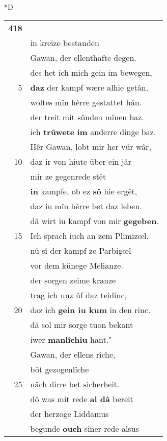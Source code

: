\documentclass[8pt,a4paper,notitlepage]{article}
\begin{document}
\begin{table}[ht]
\begin{minipage}[t]{0.5\linewidth}
\small
\begin{center}*D
\end{center}
\begin{tabular}{rl}
\textbf{418} & \textbf{\begin{large}D\end{large}â} wære von mînen handen\\ 
 & in kreize bestanden\\ 
 & Gawan, der ellenthafte degen.\\ 
 & des het ich mich gein im bewegen,\\ 
5 & \textbf{daz} der kampf wære alhie getân,\\ 
 & woltes mîn hêrre gestattet hân.\\ 
 & der treit mit sünden mînen haz.\\ 
 & ich \textbf{trûwete} \textbf{im} anderre dinge baz.\\ 
 & Hêr Gawan, lobt mir her vür wâr,\\ 
10 & daz ir von hiute über ein jâr\\ 
 & mir ze gegenrede stêt\\ 
 & \textbf{in} kampfe, ob ez \textbf{sô} hie ergêt,\\ 
 & daz iu mîn hêrre læt daz leben.\\ 
 & dâ wirt iu kampf von mir \textbf{gegeben}.\\ 
15 & Ich sprach iuch an zem Plimizœl.\\ 
 & nû sî der kampf ze Parbigœl\\ 
 & vor dem künege Melianze.\\ 
 & der sorgen zeime kranze\\ 
 & trag ich unz ûf daz teidinc,\\ 
20 & daz ich \textbf{gein iu kum} in den rinc.\\ 
 & dâ sol mir sorge tuon bekant\\ 
 & iwer \textbf{manlîchiu} hant."\\ 
 & Gawan, der ellens rîche,\\ 
 & bôt gezogenlîche\\ 
25 & nâch dirre bet sicherheit.\\ 
 & dô was mit rede \textbf{al dâ} bereit\\ 
 & der herzoge Liddamus\\ 
 & begunde \textbf{ouch} sîner rede alsus\\ 

\end{tabular}
\end{minipage}
\end{table}
\end{document}
